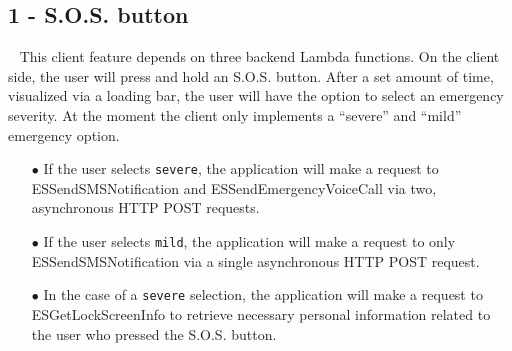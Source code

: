 \documentclass[10pt, a4paper]{article}
\begin{document}
\subsection{1 - S.O.S. button} 
\par ~ This client feature depends on three backend Lambda functions. On the client side, the user will press and hold an S.O.S. button. After a set amount of time, visualized via a loading bar, the user will have the option to select an emergency severity. At the moment the client only implements a ``severe'' and ``mild'' emergency option.
	\begin{itemize}
		\item[$\bullet$] If the user selects \texttt{severe}, the application will make a request to ESSendSMSNotification and ESSendEmergencyVoiceCall via two, asynchronous HTTP POST requests.
		\item[$\bullet$] If the user selects \texttt{mild}, the application will make a request to only ESSendSMSNotification via a single asynchronous HTTP POST request. 
		\item[$\bullet$] In the case of a \texttt{severe} selection, the application will make a request to ESGetLockScreenInfo to retrieve necessary personal information related to the user who pressed the S.O.S. button. 
	\end{itemize}
\end{document}
